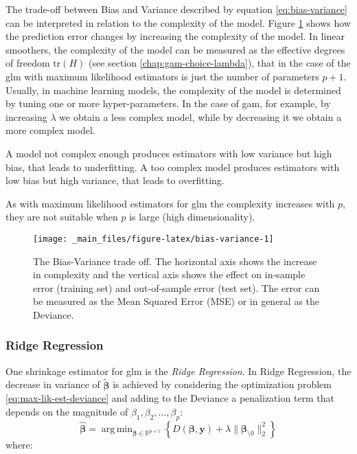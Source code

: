 \documentclass[a4paper, twoside, openright, 12pt]{report}
\DeclareMathOperator*{\argmin}{arg\,min}  %
\theoremstyle{definition}
\theoremstyle{definition}
\theoremstyle{definition}
\theoremstyle{remark}
\begin{document}
The trade-off between Bias and Variance described by equation \eqref{eq:bias-variance} can be interpreted in relation to the complexity of the model. Figure \ref{fig:bias-variance} shows how the prediction error changes by increasing the complexity of the model. In linear smoothers, the complexity of the model can be measured as the effective degrees of freedom \(\text{tr}(H)\) (see section \ref{chap:gam-choice-lambda}), that in the case of the \ac{glm} with maximum likelihood estimators is just the number of parameters \(p+1\). Usually, in machine learning models, the complexity of the model is determined by tuning one or more hyper-parameters. In the case of \ac{gam}, for example, by increasing \(\lambda\) we obtain a less complex model, while by decreasing it we obtain a more complex model.

A model not complex enough produces estimators with low variance but high bias, that leads to underfitting. A too complex model produces estimators with low bias but high variance, that leads to overfitting.

As with maximum likelihood estimators for \ac{glm} the complexity increases with \(p\), they are not suitable when \(p\) is large (high dimensionality).





\begin{figure}[!hbtp]

{\centering \texttt{[image: \_main\_files/figure-latex/bias-variance-1]} 

}

\caption[The Bias-Variance trade off.]{The Bias-Variance trade off. The horizontal axis shows the increase in complexity and the vertical axis shows the effect on in-sample error (training set) and out-of-sample error (test set). The error can be measured as the Mean Squared Error (MSE) or in general as the Deviance.}\label{fig:bias-variance}
\end{figure}

\hypertarget{ridge-regression}{%
\subsubsection{Ridge Regression}\label{ridge-regression}}

One shrinkage estimator for \ac{glm} is the \emph{Ridge Regression}. In Ridge Regression, the decrease in variance of \(\tilde{\boldsymbol{\beta}}\) is achieved by considering the optimization problem \eqref{eq:max-lik-est-deviance} and adding to the Deviance a penalization term that depends on the magnitude of \(\beta_1, \beta_2, \dots, \beta_p\):
\begin{equation}
\label{eq:ridge-est-deviance}
\hat{\boldsymbol{\beta}} = \argmin_{\boldsymbol{\beta}\in\mathbb{R}^{p+1}}{\left\{D(\boldsymbol{\beta}, \boldsymbol{y}) + \lambda \|\boldsymbol{\beta}_{\setminus0}\|_2^2\right\}}
\end{equation}
where:
\end{document}
